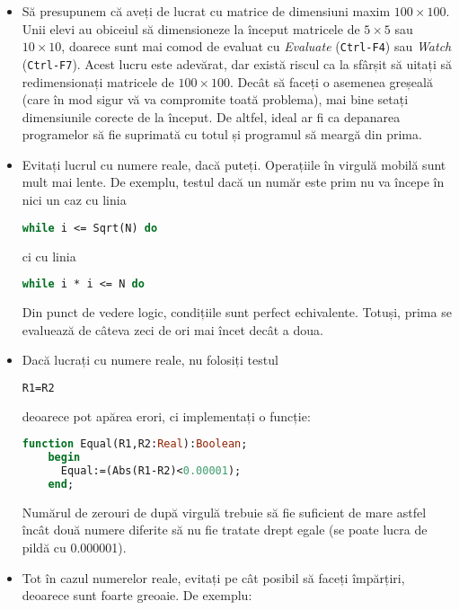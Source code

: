 \begin{itemize}
\item Să presupunem că aveți de lucrat cu matrice de dimensiuni maxim $100
  \times 100$. Unii elevi au obiceiul să dimensioneze la început matricele de
  $5 \times 5$ sau $10 \times 10$, doarece sunt mai comod de evaluat cu {\it
    Evaluate} ({\tt Ctrl-F4}) sau {\it Watch} ({\tt Ctrl-F7}). Acest lucru
  este adevărat, dar există riscul ca la sfârșit să uitați să redimensionați
  matricele de $100 \times 100$. Decât să faceți o asemenea greșeală (care în
  mod sigur vă va compromite toată problema), mai bine setați dimensiunile
  corecte de la început. De altfel, ideal ar fi ca depanarea programelor să
  fie suprimată cu totul și programul să meargă din prima.
  
\item Evitați lucrul cu numere reale, dacă puteți. Operațiile în virgulă
  mobilă sunt mult mai lente. De exemplu, testul dacă un număr este prim nu va
  începe în nici un caz cu linia

  \begin{lstlisting}[language=Pascal]
    while i <= Sqrt(N) do
  \end{lstlisting}

  ci cu linia

  \begin{lstlisting}[language=Pascal]
    while i * i <= N do
  \end{lstlisting}

  Din punct de vedere logic, condițiile sunt perfect echivalente. Totuși,
  prima se evaluează de câteva zeci de ori mai încet decât a doua.

\item Dacă lucrați cu numere reale, nu folosiți testul

  \begin{lstlisting}[language=Pascal]
    R1=R2
  \end{lstlisting}

  deoarece pot apărea erori, ci implementați o funcție:

  \begin{lstlisting}[language=Pascal]
    function Equal(R1,R2:Real):Boolean;
    begin
      Equal:=(Abs(R1-R2)<0.00001);
    end;
  \end{lstlisting}

  Numărul de zerouri de după virgulă trebuie să fie suficient de mare astfel
  încât două numere diferite să nu fie tratate drept egale (se poate lucra de
  pildă cu 0.000001).

\item Tot în cazul numerelor reale, evitați pe cât posibil să faceți
  împărțiri, deoarece sunt foarte greoaie. De exemplu:


\end{itemize}
